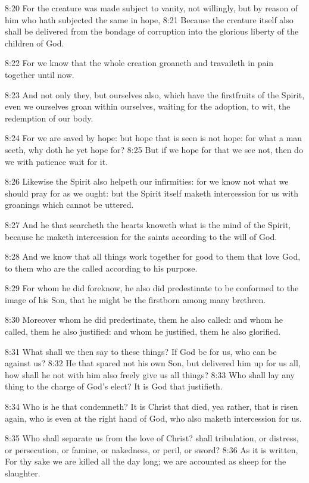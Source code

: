 8:20 For the creature was made subject to vanity, not willingly, but by reason of him who hath subjected the same in hope, 8:21 Because the creature itself also shall be delivered from the bondage of corruption into the glorious liberty of the children of God.

8:22 For we know that the whole creation groaneth and travaileth in pain together until now.

8:23 And not only they, but ourselves also, which have the firstfruits of the Spirit, even we ourselves groan within ourselves, waiting for the adoption, to wit, the redemption of our body.

8:24 For we are saved by hope: but hope that is seen is not hope: for what a man seeth, why doth he yet hope for?  8:25 But if we hope for that we see not, then do we with patience wait for it.

8:26 Likewise the Spirit also helpeth our infirmities: for we know not what we should pray for as we ought: but the Spirit itself maketh intercession for us with groanings which cannot be uttered.

8:27 And he that searcheth the hearts knoweth what is the mind of the Spirit, because he maketh intercession for the saints according to the will of God.

8:28 And we know that all things work together for good to them that love God, to them who are the called according to his purpose.

8:29 For whom he did foreknow, he also did predestinate to be conformed to the image of his Son, that he might be the firstborn among many brethren.

8:30 Moreover whom he did predestinate, them he also called: and whom he called, them he also justified: and whom he justified, them he also glorified.

8:31 What shall we then say to these things? If God be for us, who can be against us?  8:32 He that spared not his own Son, but delivered him up for us all, how shall he not with him also freely give us all things?  8:33 Who shall lay any thing to the charge of God's elect? It is God that justifieth.

8:34 Who is he that condemneth? It is Christ that died, yea rather, that is risen again, who is even at the right hand of God, who also maketh intercession for us.

8:35 Who shall separate us from the love of Christ? shall tribulation, or distress, or persecution, or famine, or nakedness, or peril, or sword?  8:36 As it is written, For thy sake we are killed all the day long; we are accounted as sheep for the slaughter.

